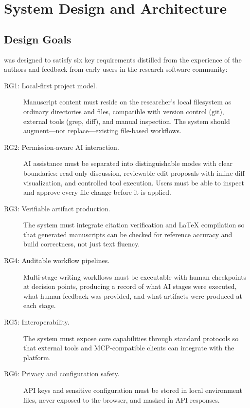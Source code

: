 \section{System Design and Architecture}
\label{sec:design}

\subsection{Design Goals}

\software{} was designed to satisfy six key requirements distilled from the
experience of the authors and feedback from early users in the research
software community:

\begin{description}
  \item[RG1: Local-first project model.] Manuscript content must reside on the
  researcher's local filesystem as ordinary directories and files, compatible
  with version control (git), external tools (grep, diff), and manual
  inspection. The system should augment---not replace---existing file-based
  workflows.

  \item[RG2: Permission-aware AI interaction.] AI assistance must be separated
  into distinguishable modes with clear boundaries: read-only discussion,
  reviewable edit proposals with inline diff visualization, and controlled tool
  execution. Users must be able to inspect and approve every file change before
  it is applied.

  \item[RG3: Verifiable artifact production.] The system must integrate
  citation verification and \LaTeX{} compilation so that generated manuscripts
  can be checked for reference accuracy and build correctness, not just text
  fluency.

  \item[RG4: Auditable workflow pipelines.] Multi-stage writing workflows must
  be executable with human checkpoints at decision points, producing a record
  of what AI stages were executed, what human feedback was provided, and what
  artifacts were produced at each stage.

  \item[RG5: Interoperability.] The system must expose core capabilities
  through standard protocols so that external tools and MCP-compatible clients
  can integrate with the platform.

  \item[RG6: Privacy and configuration safety.] API keys and sensitive
  configuration must be stored in local environment files, never exposed to the
  browser, and masked in API responses.
\end{description}

